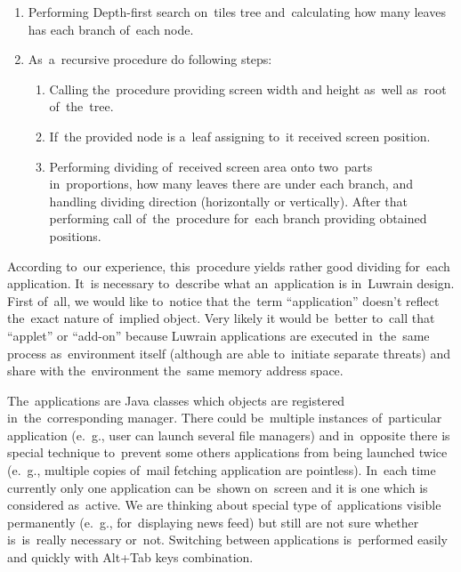\documentclass{acm_proc_article-sp}
\begin{document}
\begin{enumerate}

\item {
Performing Depth-first search on~tiles tree and~calculating 
how many leaves has each branch of~each node.
}

\item {
As~a~recursive procedure do following steps:
}

\begin{enumerate}

\item{
Calling the~procedure providing screen width and height as~well as~root of~the~tree. 
}

\item {
If~the provided node is a~leaf assigning to~it received screen position.
}

\item {
Performing dividing of~received screen area onto two~parts 
in~proportions, how many leaves there are under each branch, and handling dividing direction (horizontally or vertically).
After that performing call of~the~procedure for~each branch providing obtained positions.
}
\end{enumerate}
\end{enumerate}

According to~our experience, this~procedure yields rather good dividing for~each application.
It~is necessary to~describe what an~application is in~Luwrain design.
First of~all, we would like to~notice that the~term ``application'' doesn't reflect the~exact nature of~implied object.
Very likely it would be~better to~call that ``applet'' or ``add-on'' because Luwrain applications 
are executed in~the~same process as~environment itself (although are able to~initiate separate threats) and share with the~environment the~same memory address space.

The~applications are Java classes which objects are registered in~the~corresponding manager.
There could be~multiple instances of~particular application (e.~g., user can launch several file managers)
and in~opposite there is special technique to~prevent some others applications from being launched twice (e.~g., multiple copies of~mail fetching application are pointless).
In~each time currently only one application can be~shown on~screen 
and it is one which is considered as~active.
We are thinking about special type of~applications visible permanently 
(e.~g., for~displaying news feed)
but still are not sure whether is~is~really necessary or~not.
Switching between applications is~performed easily  and quickly with Alt+Tab keys combination.
\end{document}
